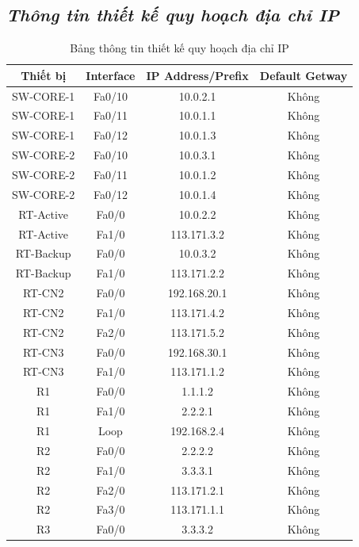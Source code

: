\documentclass[12pt, a4paper]{article}
\begin{document}
	\subsection{\textit{Thông tin thiết kế quy hoạch địa chỉ IP}}
	\begin{table}[H]
		\centering
		\caption{Bảng thông tin thiết kế quy hoạch địa chỉ IP}
		\begin{tabular}{|c|c|c|c|}
			\hline
			\textbf{Thiết bị} & \textbf{Interface} & \textbf{IP Address/Prefix} & \textbf{Default Getway}\\
			\hline
			SW-CORE-1 & Fa0/10 & 10.0.2.1 & Không\\
			\hline
			SW-CORE-1 & Fa0/11 & 10.0.1.1 & Không\\
			\hline
			SW-CORE-1 & Fa0/12 & 10.0.1.3 & Không\\
			\hline
			SW-CORE-2 & Fa0/10 & 10.0.3.1 & Không\\
			\hline
			SW-CORE-2 & Fa0/11 & 10.0.1.2 & Không\\
			\hline
			SW-CORE-2 & Fa0/12 & 10.0.1.4 & Không\\
			\hline
			RT-Active & Fa0/0 & 10.0.2.2 & Không\\
			\hline
			RT-Active & Fa1/0 & 113.171.3.2 & Không\\
			\hline
			RT-Backup & Fa0/0 & 10.0.3.2 & Không\\
			\hline
			RT-Backup & Fa1/0 & 113.171.2.2 & Không\\
			\hline
			RT-CN2 & Fa0/0 & 192.168.20.1 & Không\\
			\hline
			RT-CN2 & Fa1/0 & 113.171.4.2 & Không\\
			\hline
			RT-CN2 & Fa2/0 & 113.171.5.2 & Không\\
			\hline
			RT-CN3 & Fa0/0 & 192.168.30.1 & Không\\
			\hline
			RT-CN3 & Fa1/0 & 113.171.1.2 & Không\\
			\hline
			R1 & Fa0/0 & 1.1.1.2 & Không\\
			\hline
			R1 & Fa1/0 & 2.2.2.1 & Không\\
			\hline
			R1 & Loop & 192.168.2.4 & Không\\
			\hline
			R2 & Fa0/0 & 2.2.2.2 & Không\\
			\hline
			R2 & Fa1/0 & 3.3.3.1 & Không\\
			\hline
			R2 & Fa2/0 & 113.171.2.1 & Không\\
			\hline
			R2 & Fa3/0 & 113.171.1.1 & Không\\
			\hline
			R3 & Fa0/0 & 3.3.3.2 & Không\\

\end{tabular}
\end{table}
\end{document}
